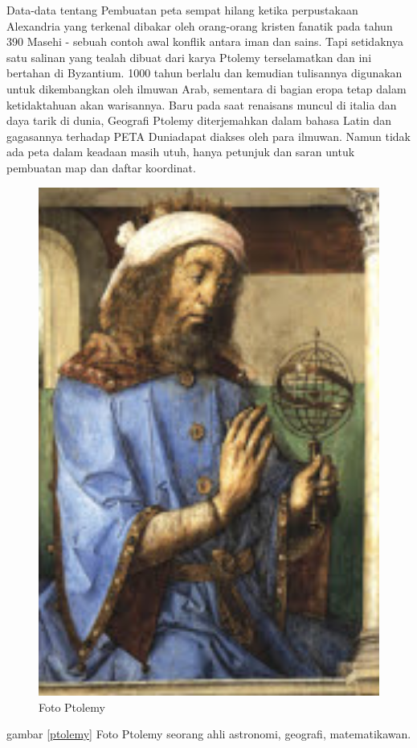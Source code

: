	Data-data tentang Pembuatan peta sempat hilang ketika perpustakaan Alexandria yang terkenal dibakar oleh orang-orang kristen fanatik pada tahun 390 Masehi - sebuah contoh awal konflik antara iman dan sains. Tapi setidaknya satu salinan yang tealah dibuat dari karya Ptolemy terselamatkan dan ini bertahan di Byzantium. 1000 tahun berlalu dan kemudian tulisannya digunakan untuk dikembangkan oleh ilmuwan Arab, sementara di bagian eropa tetap dalam ketidaktahuan akan warisannya. Baru pada saat renaisans muncul di italia dan daya tarik di dunia, Geografi Ptolemy diterjemahkan dalam bahasa Latin dan gagasannya terhadap PETA Duniadapat diakses oleh para ilmuwan.
	Namun tidak ada peta dalam keadaan masih utuh, hanya petunjuk dan saran untuk pembuatan map dan daftar koordinat.\cite{smart2005maps}
	\begin{figure} [ht]
	\centerline{\includegraphics[width=1\textwidth]{figures/ptolemy.PNG}}
	\caption{Foto Ptolemy}
	\label{PetaPtolemy}
	\end{figure}
	gambar \ref{ptolemy} Foto Ptolemy seorang ahli astronomi, geografi, matematikawan.

